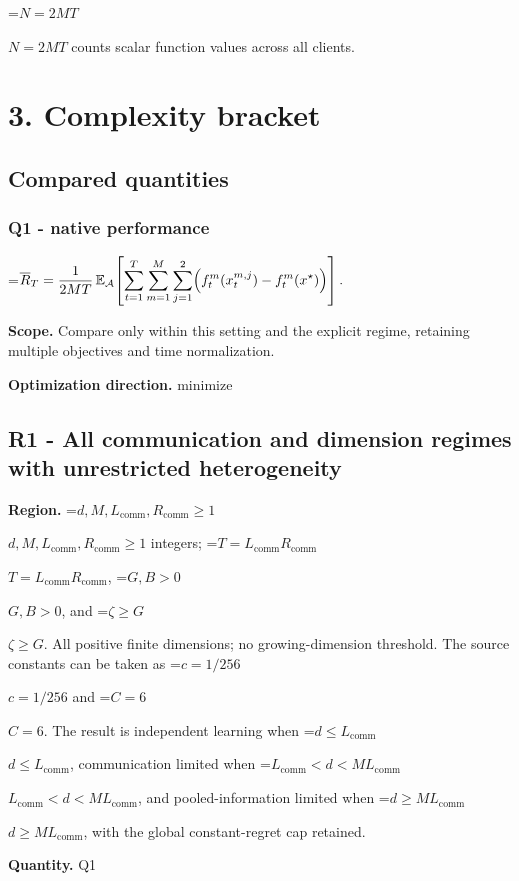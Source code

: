 \documentclass[10pt,a4paper]{article}
\newcommand{\AtlasMath}[1]{\par\begingroup\centering\setbox0=\hbox{$\displaystyle #1$}\ifdim\wd0>1.4\linewidth\typeout{ATLAS WIDE FORMULA: \the\wd0}\fi\ifdim\wd0>\linewidth\resizebox{\linewidth}{!}{\box0}\else\box0\fi\par\endgroup}
\newcommand{\AtlasInlineMath}[1]{\begingroup\setbox0=\hbox{$#1$}\ifdim\wd0>.4\linewidth\endgroup\AtlasMath{#1}\else\endgroup$#1$\fi}
\begin{document}
\AtlasInlineMath{N=2MT} counts scalar function values across all clients.



\section{3. Complexity bracket}


\subsection{Compared quantities}


\subsubsection{Q1 - native performance}


\AtlasMath{\overline R_T=\frac1{2MT}\,\mathbb E_{\mathcal A}\!\left[\sum_{t=1}^{T}\sum_{m=1}^{M}\sum_{j=1}^{2}\Bigl(f_t^m(x_t^{m,j})-f_t^m(x^\star)\Bigr)\right].}


\textbf{Scope.} Compare only within this setting and the explicit regime, retaining multiple objectives and time normalization.



\textbf{Optimization direction.} minimize



\subsection{R1 - All communication and dimension regimes with unrestricted heterogeneity}


\textbf{Region.} \AtlasInlineMath{d,M,L_{\mathrm{comm}},R_{\mathrm{comm}}\ge1} integers; \AtlasInlineMath{T=L_{\mathrm{comm}}R_{\mathrm{comm}}}, \AtlasInlineMath{G,B>0}, and \AtlasInlineMath{\zeta\ge G}. All positive finite dimensions; no growing-dimension threshold. The source constants can be taken as \AtlasInlineMath{c=1/256} and \AtlasInlineMath{C=6}. The result is independent learning when \AtlasInlineMath{d\le L_{\mathrm{comm}}}, communication limited when \AtlasInlineMath{L_{\mathrm{comm}}<d<ML_{\mathrm{comm}}}, and pooled-information limited when \AtlasInlineMath{d\ge ML_{\mathrm{comm}}}, with the global constant-regret cap retained.



\textbf{Quantity.} Q1
\end{document}
